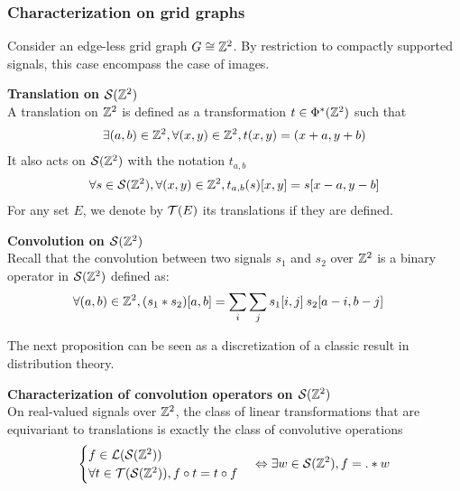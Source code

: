 \subsubsection{Characterization on grid graphs}

Consider an edge-less grid graph \ie $G \cong \bbz^2$. By restriction to compactly supported signals, this case encompass the case of images.

\begin{definition}\textbf{Translation on $\cs(\bbz^2)$}\\
A translation on $\bbz^2$ is defined as a transformation $t \in \Phi^*(\bbz^2)$ such that
\begin{gather*}
\exists (a,b) \in \bbz^2, \forall (x,y) \in \bbz^2, t(x,y) = (x+a,y+b)
\end{gather*}
It also acts on $\cs(\bbz^2)$ with the notation $t_{a,b}$ \ie
\begin{gather*}
\forall s \in \cs(\bbz^2), \forall (x,y) \in \bbz^2, t_{a,b}(s)[x,y] = s[x-a, y-b]
\end{gather*}
For any set $E$, we denote by $\ct(E)$ its translations if they are defined.
\end{definition}

\begin{definition}\textbf{Convolution on $\cs(\bbz^2)$}\\
Recall that the convolution between two signals $s_1$ and $s_2$ over $\bbz^2$ is a binary operator in $\cs(\bbz^2)$ defined as:
\begin{align*}
\forall (a,b) \in \bbz^2, (s_1 * s_2) [a,b] & = \displaystyle \sum_i \sum_j s_1[i,j] \h{2} s_2[a-i, b-j]
\end{align*}
\end{definition}

The next proposition can be seen as a discretization of a classic result in distribution theory.


\begin{proposition}\textbf{Characterization of convolution operators on $\cs(\bbz^2)$}\\
On real-valued signals over $\bbz^2$, the class of linear transformations that are equivariant to translations is exactly the class of convolutive operations \ie
\begin{gather*}
\begin{cases}
 f \in \cl(\cs(\bbz^2))\\
 \forall t \in \ct(\cs(\bbz^2)), f \circ t = t \circ f
\end{cases}
 \Leftrightarrow \exists w \in \cs(\bbz^2), f = . \ast w
\end{gather*}
\label{prop:equi}
\end{proposition}

